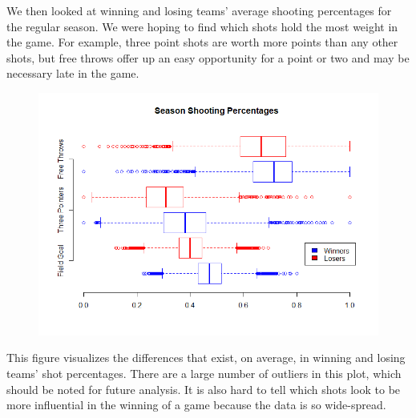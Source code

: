 \documentclass[]{scrartcl}
\begin{document}
We then looked at winning and losing teams' average shooting percentages for the regular season. We were hoping to find which shots hold the most weight in the game. For example, three point shots are worth more points than any other shots, but free throws offer up an easy opportunity for a point or two and may be necessary late in the game.
\begin{figure}[H]
	\centering
	\includegraphics[scale=.5]{SeasonShotPercent.png}
\end{figure}
This figure visualizes the differences that exist, on average, in winning and losing teams' shot percentages. There are a large number of outliers in this plot, which should be noted for future analysis. It is also hard to tell which shots look to be more influential in the winning of a game because the data is so wide-spread.
\end{document}
